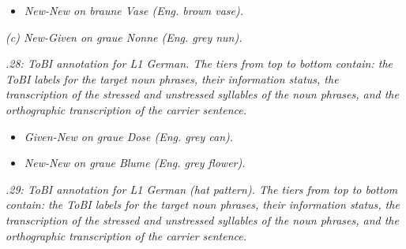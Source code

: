   
 

\begin{itemize}
\item \begin{styleListParagraph}
\textit{New-New on braune Vase (Eng. brown vase).}
\end{styleListParagraph}
\end{itemize}

  
 

\textit{(c) New-Given on graue Nonne (Eng. grey nun).}

\begin{stylelsTable}
\textit{.28: ToBI annotation for L1 German. The tiers from top to bottom contain: the ToBI labels for the target noun phrases, their information status, the transcription of the stressed and unstressed syllables of the noun phrases, and the orthographic transcription of the carrier sentence.}
\end{stylelsTable}

  
 

\begin{itemize}
\item \begin{styleListParagraph}
\textit{Given-New on graue Dose (Eng. grey can).} 
\end{styleListParagraph}
\end{itemize}

  
 

\begin{itemize}
\item \begin{styleListParagraph}
\textit{New-New on graue Blume (Eng. grey flower).}
\end{styleListParagraph}
\end{itemize}
\begin{stylelsTable}
\textit{.29: ToBI annotation for L1 German (hat pattern). The tiers from top to bottom contain: the ToBI labels for the target noun phrases, their information status, the transcription of the stressed and unstressed syllables of the noun phrases, and the orthographic transcription of the carrier sentence.}
\end{stylelsTable}

